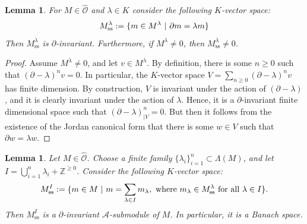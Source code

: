 \documentclass{amsart}
\newtheorem{Lemma}[defi]{Lemma}
\newcommand{\OX}{\mathcal{O}}
\begin{document}
\begin{Lemma}\label{Lemma filtrations by analytic Verma 1}
For $M\in \widehat{\OX}$ and $\lambda\in K$ consider the following $K$-vector space:
\begin{equation*}
    M_{\operatorname{ss}}^{\lambda}:=\{m\in M^{\lambda} \textnormal{ }\vert \textnormal{ } \partial m=\lambda m    \}
\end{equation*}
Then $M_{\operatorname{ss}}^{\lambda}$ is $\partial$-invariant. Furthermore, if $M^{\lambda}\neq 0$, then $M_{\operatorname{ss}}^{\lambda}\neq 0$.
\end{Lemma}
\begin{proof}
Assume $M^{\lambda}\neq 0$, and let $v\in M^{\lambda}$. By definition, there is some $n\geq 0$ such that $(\partial-\lambda)^nv=0$. In particular, the $K$-vector space $V=\sum_{n\geq 0}(\partial-\lambda)^nv$ has finite dimension. By construction, $V$ is invariant under the action of $(\partial-\lambda)$, and it is clearly invariant under the action of $\lambda$. Hence, it is a $\partial$-invariant finite dimensional space such that $(\partial -\lambda)^n_{\vert V}=0$. But then it follows from the existence of the Jordan canonical form that there is some $w\in V$ such that $\partial w=\lambda w$.
\end{proof}
\begin{Lemma}\label{Lemma filtrations by analytic Verma 2}
Let $M\in \widehat{\OX}$. Choose a finite family $\{\lambda_i\}_{i=1}^n\subset \Lambda(M)$, and let $I=\bigcup_{i=1}^n\lambda_i+ \mathbb{Z}^{\geq 0}$. Consider the following $K$-vector space:
\begin{equation*}
    M^I_{\operatorname{ss}}:=\{ m\in M \textnormal{ }\vert \textnormal{ } m=\sum_{\lambda \in I} m_{\lambda}, \textnormal{ where } m_{\lambda}\in M^{\lambda}_{\operatorname{ss}} \textnormal{ for all }\lambda \in I\}.
\end{equation*}
Then $M^I_{\operatorname{ss}}$ is a $\partial$-invariant $\mathscr{A}$-submodule of $M$. In particular, it is a Banach space.
\end{Lemma}
\end{document}
